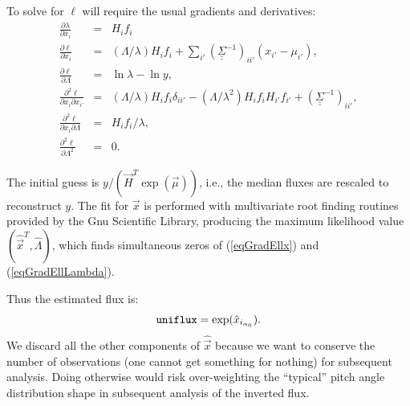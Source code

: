 \documentclass{article}    %
\newcommand{\dbul}[1]{\underline{\underline{#1}}}
\begin{document}
To solve for $\ell$ will require the usual gradients and derivatives:
\begin{eqnarray}
\frac{\partial \lambda}{\partial x_i} &=& H_i f_i\\
\frac{\partial \ell}{\partial x_i} &=&
(\Lambda/\lambda) H_i f_i + \sum_{i'}\left(\dbul{\Sigma}^{-1}\right)_{ii'}(x_{i'}-\mu_{i'}) , \label{eqGradEllx} \\
\frac{\partial \ell}{\partial \Lambda} &=& \ln\lambda-\ln y, \label{eqGradEllLambda} \\
\frac{\partial^2 \ell}{\partial x_i \partial x_{i'}} &=&
(\Lambda/\lambda) H_i f_i \delta_{ii'} 
-(\Lambda/\lambda^2) H_i f_i H_{i'} f_{i'} +
\left(\dbul{\Sigma}^{-1}\right)_{ii'}, \\
\frac{\partial^2 \ell}{\partial x_i \partial \Lambda} &=&
H_i f_i/\lambda, \\
\frac{\partial^2 \ell}{\partial \Lambda^2} &=& 0.
\end{eqnarray}

The initial guess is $y/(\vec{H}^T\exp(\vec{\mu}))$, i.e., the median
fluxes are rescaled to reconstruct $y$.  The fit for $\vec{x}$ is
performed with multivariate root finding routines provided by the Gnu
Scientific Library, producing the maximum likelihood value
$(\hat{\vec{x}}^T,\hat{\Lambda})$, which finds simultaneous zeros of (\ref{eqGradEllx})
and (\ref{eqGradEllLambda}).

Thus the estimated flux is:
\begin{equation}
\verb|uniflux| = \exp(\hat{x}_{i_{\alpha_0}}).
\end{equation}
We discard all the other components of $\hat{\vec{x}}$ because we want
to conserve the number of observations (one cannot get something for
nothing) for subsequent analysis. Doing otherwise would risk
over-weighting the ``typical'' pitch angle distribution shape in
subsequent analysis of the inverted flux.
\end{document}

